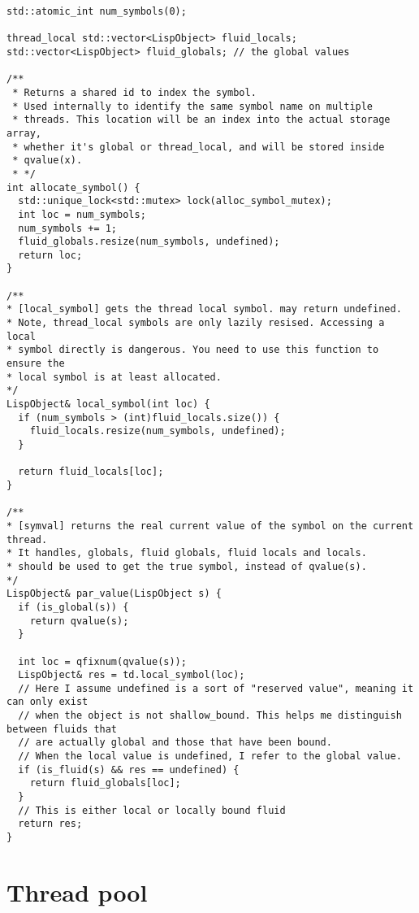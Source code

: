\begin{code}
\begin{verbatim}
std::atomic_int num_symbols(0);

thread_local std::vector<LispObject> fluid_locals;
std::vector<LispObject> fluid_globals; // the global values

/**
 * Returns a shared id to index the symbol.
 * Used internally to identify the same symbol name on multiple
 * threads. This location will be an index into the actual storage array,
 * whether it's global or thread_local, and will be stored inside
 * qvalue(x).
 * */
int allocate_symbol() {
  std::unique_lock<std::mutex> lock(alloc_symbol_mutex);
  int loc = num_symbols;
  num_symbols += 1;
  fluid_globals.resize(num_symbols, undefined);
  return loc;
}

/**
* [local_symbol] gets the thread local symbol. may return undefined.
* Note, thread_local symbols are only lazily resised. Accessing a local
* symbol directly is dangerous. You need to use this function to ensure the
* local symbol is at least allocated.
*/
LispObject& local_symbol(int loc) {
  if (num_symbols > (int)fluid_locals.size()) {
    fluid_locals.resize(num_symbols, undefined);
  }

  return fluid_locals[loc];
}

/**
* [symval] returns the real current value of the symbol on the current thread.
* It handles, globals, fluid globals, fluid locals and locals.
* should be used to get the true symbol, instead of qvalue(s).
*/
LispObject& par_value(LispObject s) {
  if (is_global(s)) {
    return qvalue(s);
  }

  int loc = qfixnum(qvalue(s));
  LispObject& res = td.local_symbol(loc);
  // Here I assume undefined is a sort of "reserved value", meaning it can only exist
  // when the object is not shallow_bound. This helps me distinguish between fluids that
  // are actually global and those that have been bound.
  // When the local value is undefined, I refer to the global value.
  if (is_fluid(s) && res == undefined) {
    return fluid_globals[loc];
  }
  // This is either local or locally bound fluid
  return res;
}
\end{verbatim}
\end{code}

\section{Thread pool}
\label{sec:threadpool-code}

